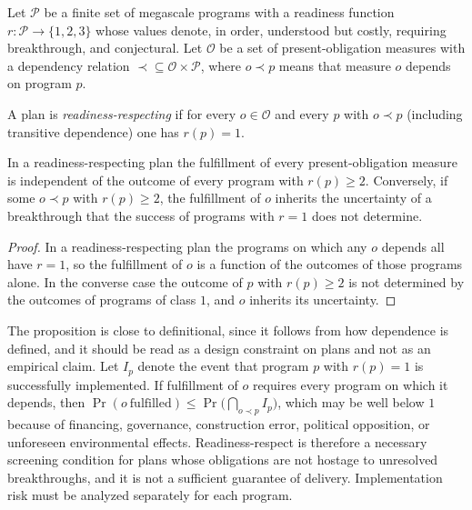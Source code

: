 Let $\mathcal{P}$ be a finite set of megascale programs with a readiness function $r:\mathcal{P}\to\{1,2,3\}$ whose values denote, in order, understood but costly, requiring breakthrough, and conjectural. Let $\mathcal{O}$ be a set of present-obligation measures with a dependency relation $\prec\subseteq\mathcal{O}\times\mathcal{P}$, where $o\prec p$ means that measure $o$ depends on program $p$.

\begin{definition}
A plan is \emph{readiness-respecting} if for every $o\in\mathcal{O}$ and every $p$ with $o\prec p$ (including transitive dependence) one has $r(p)=1$.
\end{definition}

\begin{proposition}
In a readiness-respecting plan the fulfillment of every present-obligation measure is independent of the outcome of every program with $r(p)\ge2$. Conversely, if some $o\prec p$ with $r(p)\ge2$, the fulfillment of $o$ inherits the uncertainty of a breakthrough that the success of programs with $r=1$ does not determine.
\end{proposition}

\begin{proof}
In a readiness-respecting plan the programs on which any $o$ depends all have $r=1$, so the fulfillment of $o$ is a function of the outcomes of those programs alone. In the converse case the outcome of $p$ with $r(p)\ge2$ is not determined by the outcomes of programs of class $1$, and $o$ inherits its uncertainty.
\end{proof}

\begin{remark}
The proposition is close to definitional, since it follows from how dependence is defined, and it should be read as a design constraint on plans and not as an empirical claim. Let $I_p$ denote the event that program $p$ with $r(p)=1$ is successfully implemented. If fulfillment of $o$ requires every program on which it depends, then $\Pr(o\ \text{fulfilled})\le\Pr\big(\bigcap_{o\prec p}I_p\big)$, which may be well below $1$ because of financing, governance, construction error, political opposition, or unforeseen environmental effects. Readiness-respect is therefore a necessary screening condition for plans whose obligations are not hostage to unresolved breakthroughs, and it is not a sufficient guarantee of delivery. Implementation risk must be analyzed separately for each program.
\end{remark}

